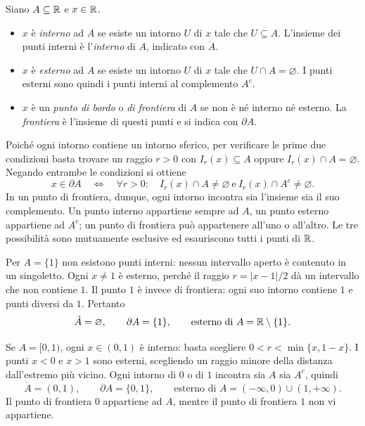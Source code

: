 \begin{definizione}
Siano $A\subseteq\mathbb{R}$ e $x\in\mathbb{R}$.
\begin{itemize}
  \item $x$ è \emph{interno} ad $A$ se esiste un intorno $U$ di $x$ tale che $U\subseteq A$. L'insieme dei punti interni è l'\emph{interno} di $A$, indicato con $\mathring A$.
  \item $x$ è \emph{esterno} ad $A$ se esiste un intorno $U$ di $x$ tale che $U\cap A=\varnothing$. I punti esterni sono quindi i punti interni al complemento $A^c$.
  \item $x$ è un \emph{punto di bordo} o \emph{di frontiera} di $A$ se non è né interno né esterno. La \emph{frontiera} è l'insieme di questi punti e si indica con $\partial A$.
\end{itemize}
\end{definizione}

Poiché ogni intorno contiene un intorno sferico, per verificare le prime due condizioni basta trovare un raggio $r>0$ con $I_r(x)\subseteq A$ oppure $I_r(x)\cap A=\varnothing$. Negando entrambe le condizioni si ottiene
\[
x\in\partial A
\quad\Longleftrightarrow\quad
\forall r>0:\quad I_r(x)\cap A\ne\varnothing
\ \text{e}\ I_r(x)\cap A^c\ne\varnothing.
\]
In un punto di frontiera, dunque, ogni intorno incontra sia l'insieme sia il suo complemento. Un punto interno appartiene sempre ad $A$, un punto esterno appartiene ad $A^c$; un punto di frontiera può appartenere all'uno o all'altro. Le tre possibilità sono mutuamente esclusive ed esauriscono tutti i punti di $\mathbb{R}$.

\begin{esempio}[Un singoletto]
Per $A=\{1\}$ non esistono punti interni: nessun intervallo aperto è contenuto in un singoletto. Ogni $x\ne1$ è esterno, perché il raggio $r=|x-1|/2$ dà un intervallo che non contiene $1$. Il punto $1$ è invece di frontiera: ogni suo intorno contiene $1$ e punti diversi da $1$. Pertanto
\[
\mathring A=\varnothing,\qquad \partial A=\{1\},
\qquad \text{esterno di }A=\mathbb{R}\setminus\{1\}.
\]
\end{esempio}

\begin{esempio}
Se $A=[0,1)$, ogni $x\in(0,1)$ è interno: basta scegliere $0<r<\min\{x,1-x\}$. I punti $x<0$ e $x>1$ sono esterni, scegliendo un raggio minore della distanza dall'estremo più vicino. Ogni intorno di $0$ o di $1$ incontra sia $A$ sia $A^c$, quindi
\[
\mathring A=(0,1),\qquad \partial A=\{0,1\},
\qquad \text{esterno di }A=(-\infty,0)\cup(1,+\infty).
\]
Il punto di frontiera $0$ appartiene ad $A$, mentre il punto di frontiera $1$ non vi appartiene.
\end{esempio}

